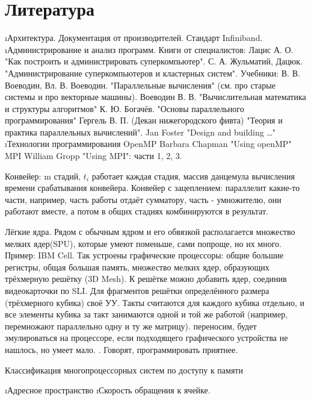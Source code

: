  \section{Литература}
 \begin{enumerate}
  \i Архитектура.
   Документация от производителей.
   Стандарт Infiniband.
  \i Администрирование и анализ программ.
   Книги от специалистов:
    Лацис А. О. "Как построить и администрировать суперкомпьютер".
    С. А. Жульматий, Дацюк. "Администрирование суперкомпьютеров и кластерных систем".
   Учебники:
    В. В. Воеводин, Вл. В. Воеводин. "Параллельные вычисления" (см. про старые системы и про векторные машины).
    Воеводин В. В. "Вычислительная математика и структуры алгоритмов"
    К. Ю. Богачёв. "Основы параллельного программирования"
    Гергель В. П. (Декан нижегородского фивта) "Теория и практика параллельных вычислений".
    Jan Foster "Design and building \dots"
  \i Технологии программирования
    OpenMP Barbara Chapman "Using openMP"
    MPI William Gropp "Using MPI": части 1, 2, 3.
 \end{enumerate}
 
 Конвейер: m стадий, $t_i$ работает каждая стадия, массив данцемула вычисления времени срабатывания конвейера.
 Конвейер с зацеплением: параллелит какие-то части, например, часть работы отдаёт сумматору, часть - умножителю, они работают вместе, а потом в общих стадиях комбинируются в результат.
 
 Лёгкие ядра.
 Рядом с обычным ядром и его обвязкой располагается множество мелких ядер(SPU), которые умеют поменьше, сами попроще, но их много. Пример: IBM Cell.
 Так устроены графические процессоры: общие большие регистры, общая большая память, множество мелких ядер, образующих трёхмерную решётку (3D Mesh). К решётке можно добавить ядер, соединив видеокарточки по SLI.
 Для фрагментов решётки определённого размера (трёхмерного кубика) своё УУ. Такты считаются для каждого кубика отдельно, и все элементы кубика за такт занимаются одной и той же работой (например, перемножают параллельно одну и ту же матрицу).
  переносим, будет эмулироваться на процессоре, если подходящего графического устройства не нашлось, но умеет мало.
 . Говорят, программировать приятнее. 
 
 Классификация многопроцессорных систем по доступу к памяти
 \begin{enumerate}
  \i Адресное пространство
  \i Скорость обращения к ячейке.
 \end{enumerate}
 
